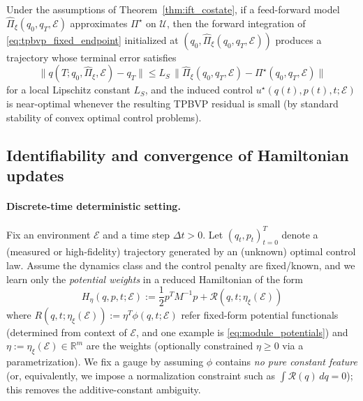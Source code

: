 \begin{corollary}
\label{cor:forward_only_det}
Under the assumptions of Theorem~\ref{thm:ift_costate}, if a feed-forward model $\widehat \Pi_\xi(q_0,q_T,\mathcal E)$
approximates $\Pi^\star$ on $\mathcal U$, then the forward integration of \cref{eq:tpbvp_fixed_endpoint} initialized at
$(q_0,\widehat \Pi_\xi(q_0,q_T,\mathcal E))$ produces a trajectory whose terminal error satisfies
\[
\|q(T;q_0,\widehat \Pi_\xi,\mathcal E)-q_T\|
\le L_S\,\|\widehat \Pi_\xi(q_0,q_T,\mathcal E)-\Pi^\star(q_0,q_T,\mathcal E)\|
\]
for a local Lipschitz constant $L_S$, and the induced control $u^\star(q(t),p(t),t;\mathcal E)$ is near-optimal
whenever the resulting TPBVP residual is small (by standard stability of convex optimal control problems).
\end{corollary}

\subsection{Identifiability and convergence of Hamiltonian updates}
\label{app:learnability}

\paragraph{Discrete-time deterministic setting.}
Fix an environment $\mathcal E$ and a time step $\Delta t>0$. Let $(q_t,p_t)_{t=0}^{T}$ denote a (measured or high-fidelity)
trajectory generated by an (unknown) optimal control law. Assume the dynamics class and the control penalty are fixed/known, and
we learn only the \emph{potential weights} in a reduced Hamiltonian of the form
\begin{equation}
\label{eq:H_eta_discrete}
H_\eta(q,p,t;\mathcal E)
:=  \frac{1}{2}p^TM^{-1}p
+\mathcal R(q, t;\eta_{\xi}(\mathcal{E}))
\end{equation}
where $R(q, t;\eta_{\xi}(\mathcal{E})):=\eta^T\phi(q,t;\mathcal E)$ refer fixed-form potential functionals (determined from context of $\mathcal{E}$, and one example is \cref{eq:module_potentials}) and
$\eta:= \eta_{\xi}(\mathcal{E})\in\mathbb R^{m}$ are the weights (optionally constrained $\eta\ge 0$ via a parametrization).
We fix a gauge by assuming $\phi$ contains \emph{no pure constant feature} (or, equivalently, we impose a normalization constraint
such as $\int \mathcal R(q)\,dq=0$); this removes the additive-constant ambiguity.

